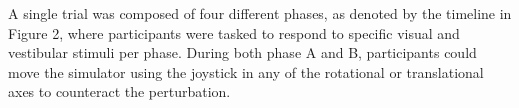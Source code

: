 \documentclass[11pt, onecolumn]{article}
\begin{document}

A single trial was composed of four different phases, as denoted by the timeline in Figure 2, where participants were tasked to respond to specific visual and vestibular stimuli per phase.  During both phase A and B, participants could move the simulator using the joystick in any of the rotational or translational axes to counteract the perturbation. 

\end{document}
